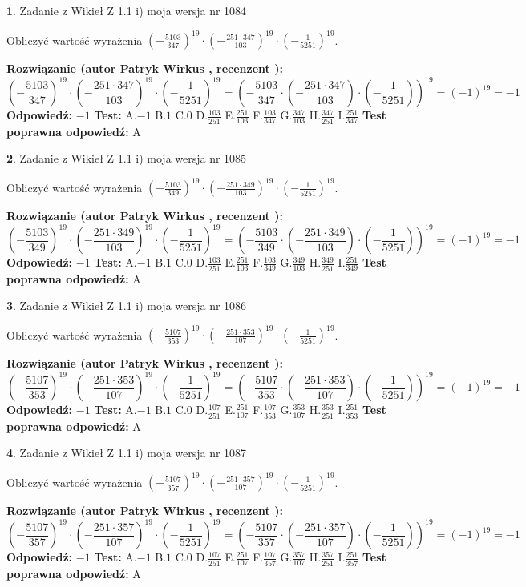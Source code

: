 \documentclass[12pt, a4paper]{article}
\theoremstyle{definition} %
\newtheorem{zad}{}
\newcommand{\zadStart}[1]{\begin{zad}#1\newline}
\newcommand{\zadStop}{\end{zad}}
\newcommand{\rozwStart}[2]{\noindent \textbf{Rozwiązanie (autor #1 , recenzent #2): }\newline}
\newcommand{\rozwStop}{\newline}
\newcommand{\odpStart}{\noindent \textbf{Odpowiedź:}\newline}
\newcommand{\odpStop}{\newline}
\newcommand{\testStart}{\noindent \textbf{Test:}\newline}
\newcommand{\testStop}{\newline}
\newcommand{\kluczStart}{\noindent \textbf{Test poprawna odpowiedź:}\newline}
\newcommand{\kluczStop}{\newline}
\begin{document}
\zadStart{Zadanie z Wikieł Z 1.1 i) moja wersja nr 1084}

Obliczyć wartość wyrażenia $(-\frac{5103}{347})^{19} \cdot (-\frac{251 \cdot 347}{103})^{19} \cdot (-\frac{1}{5251})^{19}$.
\zadStop
\rozwStart{Patryk Wirkus}{}
$$(-\frac{5103}{347})^{19} \cdot (-\frac{251 \cdot 347}{103})^{19} \cdot (-\frac{1}{5251})^{19} = (-\frac{5103}{347} \cdot (-\frac{251 \cdot 347}{103}) \cdot (-\frac{1}{5251}))^{19} = (-1)^{19} = -1$$
\rozwStop
\odpStart
$-1$
\odpStop
\testStart
A.$-1$ B.$1$ C.$0$ D.$\frac{103}{251}$ E.$\frac{251}{103}$
F.$\frac{103}{347}$ G.$\frac{347}{103}$
H.$\frac{347}{251}$
I.$\frac{251}{347}$
\testStop
\kluczStart
A
\kluczStop



\zadStart{Zadanie z Wikieł Z 1.1 i) moja wersja nr 1085}

Obliczyć wartość wyrażenia $(-\frac{5103}{349})^{19} \cdot (-\frac{251 \cdot 349}{103})^{19} \cdot (-\frac{1}{5251})^{19}$.
\zadStop
\rozwStart{Patryk Wirkus}{}
$$(-\frac{5103}{349})^{19} \cdot (-\frac{251 \cdot 349}{103})^{19} \cdot (-\frac{1}{5251})^{19} = (-\frac{5103}{349} \cdot (-\frac{251 \cdot 349}{103}) \cdot (-\frac{1}{5251}))^{19} = (-1)^{19} = -1$$
\rozwStop
\odpStart
$-1$
\odpStop
\testStart
A.$-1$ B.$1$ C.$0$ D.$\frac{103}{251}$ E.$\frac{251}{103}$
F.$\frac{103}{349}$ G.$\frac{349}{103}$
H.$\frac{349}{251}$
I.$\frac{251}{349}$
\testStop
\kluczStart
A
\kluczStop



\zadStart{Zadanie z Wikieł Z 1.1 i) moja wersja nr 1086}

Obliczyć wartość wyrażenia $(-\frac{5107}{353})^{19} \cdot (-\frac{251 \cdot 353}{107})^{19} \cdot (-\frac{1}{5251})^{19}$.
\zadStop
\rozwStart{Patryk Wirkus}{}
$$(-\frac{5107}{353})^{19} \cdot (-\frac{251 \cdot 353}{107})^{19} \cdot (-\frac{1}{5251})^{19} = (-\frac{5107}{353} \cdot (-\frac{251 \cdot 353}{107}) \cdot (-\frac{1}{5251}))^{19} = (-1)^{19} = -1$$
\rozwStop
\odpStart
$-1$
\odpStop
\testStart
A.$-1$ B.$1$ C.$0$ D.$\frac{107}{251}$ E.$\frac{251}{107}$
F.$\frac{107}{353}$ G.$\frac{353}{107}$
H.$\frac{353}{251}$
I.$\frac{251}{353}$
\testStop
\kluczStart
A
\kluczStop



\zadStart{Zadanie z Wikieł Z 1.1 i) moja wersja nr 1087}

Obliczyć wartość wyrażenia $(-\frac{5107}{357})^{19} \cdot (-\frac{251 \cdot 357}{107})^{19} \cdot (-\frac{1}{5251})^{19}$.
\zadStop
\rozwStart{Patryk Wirkus}{}
$$(-\frac{5107}{357})^{19} \cdot (-\frac{251 \cdot 357}{107})^{19} \cdot (-\frac{1}{5251})^{19} = (-\frac{5107}{357} \cdot (-\frac{251 \cdot 357}{107}) \cdot (-\frac{1}{5251}))^{19} = (-1)^{19} = -1$$
\rozwStop
\odpStart
$-1$
\odpStop
\testStart
A.$-1$ B.$1$ C.$0$ D.$\frac{107}{251}$ E.$\frac{251}{107}$
F.$\frac{107}{357}$ G.$\frac{357}{107}$
H.$\frac{357}{251}$
I.$\frac{251}{357}$
\testStop
\kluczStart
A
\kluczStop
\end{document}
